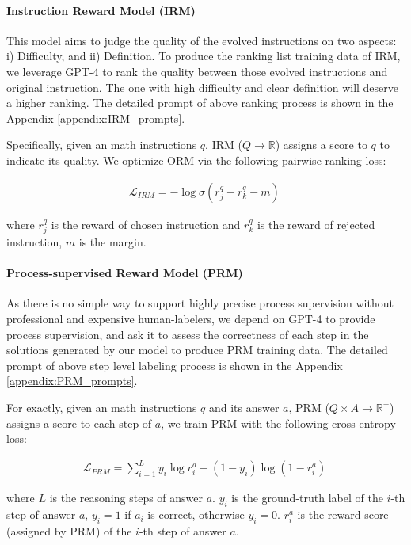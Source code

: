 \paragraph{Instruction Reward Model (IRM)} This model aims to judge the quality of the evolved instructions on two aspects: i) Difficulty, and ii) Definition. To produce the ranking list training data of IRM, we leverage GPT-4 to rank the quality between those evolved instructions and original instruction. The one with high difficulty and clear definition will deserve a higher ranking. The detailed prompt of above ranking process is shown in the Appendix \ref{appendix:IRM_prompts}. 

Specifically, given an math instructions $q$, IRM ($Q \rightarrow \mathbb{R} $) assigns a score to $q$ to indicate its quality. We optimize ORM via the following pairwise ranking loss:

\begin{align}
\mathcal{L}_{IRM}= - \log \sigma(r^q_j - r^q_k - m)\
\label{eq:pairwise-loss}
\end{align}

where $r^q_j$ is the reward of chosen instruction and  $r^q_k$ is the reward of rejected instruction, $m$ is the margin.

\paragraph{Process-supervised Reward Model (PRM)} As there is no simple way to support highly precise process supervision without professional and expensive human-labelers, we depend on GPT-4 to provide process supervision, and ask it to assess the correctness of each step in the solutions generated by our model to produce PRM training data. The detailed prompt of above step level labeling process is shown in the Appendix \ref{appendix:PRM_prompts}. 

For exactly, given an math instructions $q$ and its answer $a$,  PRM ($Q \times A \rightarrow \mathbb{R}^{+}$) assigns a score to each step of $a$, we train PRM with the following cross-entropy loss:

\begin{align}
\mathcal{L}_{PRM}= \sum_{i=1}^{L} y_i \log r^a_i + (1 - y_i) \log(1 - r^a_i)\
\label{eq:prm-loss}
\end{align}

where $L$ is the reasoning steps of answer $a$. $y_i$ is the ground-truth label of the $i$-th step of answer $a$, $y_i = 1$ if $a_i$ is correct, otherwise $y_i = 0$. $r^a_i$ is the reward score (assigned by PRM) of the $i$-th step of answer $a$.

